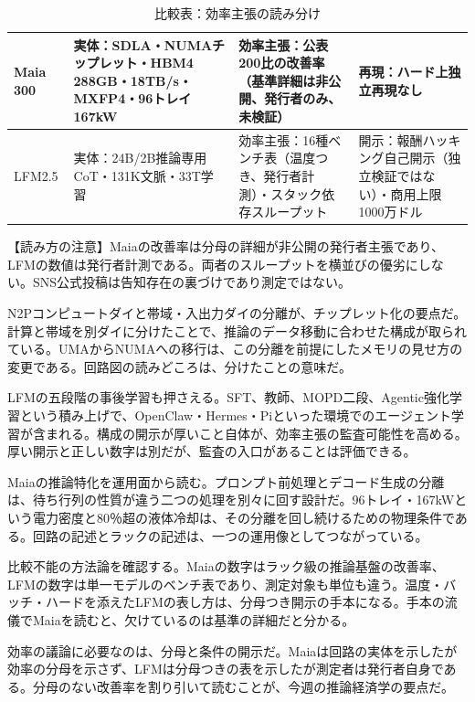 \documentclass[lualatex,a4paper,10pt]{jlreq}
\begin{document}
\begin{table}[htbp]\centering\footnotesize
\caption{比較表：効率主張の読み分け}
\begin{tabularx}{0.96\linewidth}{@{}lXXX@{}}
\toprule
Maia 300 & 実体：SDLA・NUMAチップレット・HBM4 288GB・18TB/s・MXFP4・96トレイ167kW & 効率主張：公表200比の改善率（基準詳細は非公開、発行者のみ、未検証） & 再現：ハード上独立再現なし \\
\midrule
LFM2.5 & 実体：24B/2B推論専用CoT・131K文脈・33T学習 & 効率主張：16種ベンチ表（温度つき、発行者計測）・スタック依存スループット & 開示：報酬ハッキング自己開示（独立検証ではない）・商用上限1000万ドル \\
\bottomrule
\end{tabularx}
\end{table}
\begin{tcolorbox}[colback=SurveySoft,colframe=SurveyRule,arc=1mm,boxrule=0.4pt,left=2mm,right=2mm]
【読み方の注意】Maiaの改善率は分母の詳細が非公開の発行者主張であり、LFMの数値は発行者計測である。両者のスループットを横並びの優劣にしない。SNS公式投稿は告知存在の裏づけであり測定ではない。
\end{tcolorbox}
N2Pコンピュートダイと帯域・入出力ダイの分離が、チップレット化の要点だ。計算と帯域を別ダイに分けたことで、推論のデータ移動に合わせた構成が取られている。UMAからNUMAへの移行は、この分離を前提にしたメモリの見せ方の変更である。回路図の読みどころは、分けたことの意味だ。

LFMの五段階の事後学習も押さえる。SFT、教師、MOPD二段、Agentic強化学習という積み上げで、OpenClaw・Hermes・Piといった環境でのエージェント学習が含まれる。構成の開示が厚いこと自体が、効率主張の監査可能性を高める。厚い開示と正しい数字は別だが、監査の入口があることは評価できる。

Maiaの推論特化を運用面から読む。プロンプト前処理とデコード生成の分離は、待ち行列の性質が違う二つの処理を別々に回す設計だ。96トレイ・167kWという電力密度と80％超の液体冷却は、その分離を回し続けるための物理条件である。回路の記述とラックの記述は、一つの運用像としてつながっている。

比較不能の方法論を確認する。Maiaの数字はラック級の推論基盤の改善率、LFMの数字は単一モデルのベンチ表であり、測定対象も単位も違う。温度・バッチ・ハードを添えたLFMの表し方は、分母つき開示の手本になる。手本の流儀でMaiaを読むと、欠けているのは基準の詳細だと分かる。

効率の議論に必要なのは、分母と条件の開示だ。Maiaは回路の実体を示したが効率の分母を示さず、LFMは分母つきの表を示したが測定者は発行者自身である。分母のない改善率を割り引いて読むことが、今週の推論経済学の要点だ。
\end{document}
